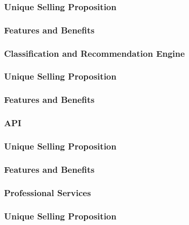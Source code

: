 \subsubsection*{Unique Selling Proposition}

\subsubsection*{Features and Benefits}


\subsubsection{Classification and Recommendation Engine}

\subsubsection*{Unique Selling Proposition}

\subsubsection*{Features and Benefits}


\subsubsection{API}

\subsubsection*{Unique Selling Proposition}

\subsubsection*{Features and Benefits}


\subsubsection{Professional Services}

\subsubsection*{Unique Selling Proposition}

